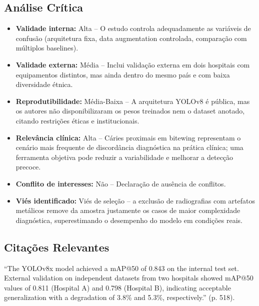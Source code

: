 \subsection{Análise Crítica}
\begin{itemize}
  \item \textbf{Validade interna:} Alta -- O estudo controla adequadamente
        as variáveis de confusão (arquitetura fixa, data augmentation
        controlada, comparação com múltiplos baselines).
  \item \textbf{Validade externa:} Média -- Inclui validação externa em
        dois hospitais com equipamentos distintos, mas ainda dentro do
        mesmo país e com baixa diversidade étnica.
  \item \textbf{Reprodutibilidade:} Média-Baixa -- A arquitetura YOLOv8
        é pública, mas os autores não disponibilizaram os pesos treinados
        nem o dataset anotado, citando restrições éticas e institucionais.
  \item \textbf{Relevância clínica:} Alta -- Cáries proximais em bitewing
        representam o cenário mais frequente de discordância diagnóstica
        na prática clínica; uma ferramenta objetiva pode reduzir a
        variabilidade e melhorar a detecção precoce.
  \item \textbf{Conflito de interesses:} Não -- Declaração de ausência de
        conflitos.
  \item \textbf{Viés identificado:} Viés de seleção -- a exclusão de
        radiografias com artefatos metálicos remove da amostra justamente
        os casos de maior complexidade diagnóstica, superestimando o
        desempenho do modelo em condições reais.
\end{itemize}

\subsection{Citações Relevantes}
\begin{citacao}
``The YOLOv8x model achieved a mAP@50 of 0.843 on the internal test set.
External validation on independent datasets from two hospitals showed
mAP@50 values of 0.811 (Hospital A) and 0.798 (Hospital B), indicating
acceptable generalization with a degradation of 3.8\% and 5.3\%,
respectively.'' (p. 518).
\end{citacao}

